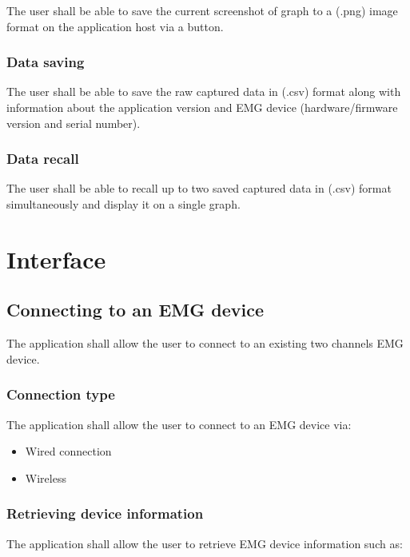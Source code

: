 \documentclass[12pt,a4paper]{article}
\begin{document}
The user shall be able to save the current screenshot of graph to a (.png) image format on the application host via a button.

\subsubsection{Data saving}

The user shall be able to save the raw captured data in (.csv) format along with information about the application version and EMG device (hardware/firmware version and serial number).

\subsubsection{Data recall}

The user shall be able to recall up to two saved captured data in (.csv) format simultaneously and display it on a single graph.

\newpage

\section{Interface}

\subsection{Connecting to an EMG device}

The application shall allow the user to connect to an existing two channels EMG device.

\subsubsection{Connection type}

The application shall allow the user to connect to an EMG device via:

\begin{itemize}
\item Wired connection
\item Wireless
\end{itemize}

\subsubsection{Retrieving device information}

The application shall allow the user to retrieve EMG device information such as: 
\end{document}

